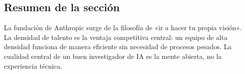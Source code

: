 \subsection{Resumen de la sección}

La fundación de Anthropic surge de la filosofía de «ir a hacer tu propia visión». La densidad de talento es la ventaja competitiva central: un equipo de alta densidad funciona de manera eficiente sin necesidad de procesos pesados. La cualidad central de un buen investigador de IA es la mente abierta, no la experiencia técnica.

